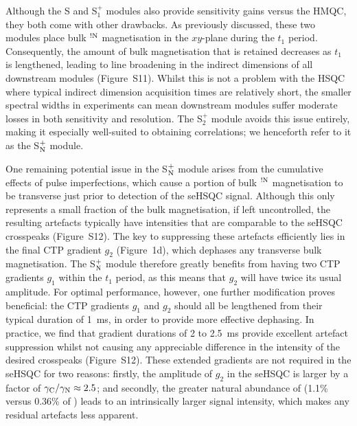 \documentclass[final,twocolumn]{elsarticle}
\newcommand*{\noahS}{S}
\newcommand*{\noahSpa}{S$^+_1$}
\newcommand*{\noahSpb}{S$^+_2$}
\newcommand*{\noahSpn}{S$\rm ^+_N$}
\newcommand*{\carbon}{\ce{^{13}C}}
\newcommand*{\nitrogen}{\ce{^{15}N}}
\newcommand*{\magnnot}[1]{\ce{^1H}$^{!#1}$}
\begin{document}
Although the \noahS{} and \noahSpa{} modules also provide sensitivity gains versus the HMQC, they both come with other drawbacks.
As previously discussed, these two modules place bulk \magnnot{\ce{N}} magnetisation in the $xy$-plane during the $t_1$ period.
Consequently, the amount of bulk magnetisation that is retained decreases as $t_1$ is lengthened, leading to line broadening in the indirect dimensions of all downstream modules (Figure~S11).
Whilst this is not a problem with the \carbon{} HSQC where typical \carbon{} indirect dimension acquisition times are relatively short, the smaller spectral widths in \nitrogen{} experiments can mean downstream modules suffer moderate losses in both sensitivity and resolution.
The \noahSpb{} module avoids this issue entirely, making it especially well-suited to obtaining \nitrogen{} correlations; we henceforth refer to it as the \noahSpn{} module.

One remaining potential issue in the \noahSpn{} module arises from the cumulative effects of pulse imperfections, which cause a portion of bulk \magnnot{\ce{N}} magnetisation to be transverse just prior to detection of the seHSQC signal.
Although this only represents a small fraction of the bulk magnetisation, if left uncontrolled, the resulting artefacts typically have intensities that are comparable to the seHSQC crosspeaks (Figure~S12).
The key to suppressing these artefacts efficiently lies in the final CTP gradient $g_2$ (Figure~1d), which dephases any transverse bulk magnetisation.
The \noahSpn{} module therefore greatly benefits from having two CTP gradients $g_1$ within the $t_1$ period, as this means that $g_2$ will have twice its usual amplitude.
For optimal performance, however, one further modification proves beneficial: the CTP gradients $g_1$ and $g_2$ should all be lengthened from their typical duration of \SI{1}{\ms}, in order to provide more effective dephasing.
In practice, we find that gradient durations of 2 to \SI{2.5}{\ms} provide excellent artefact suppression whilst not causing any appreciable difference in the intensity of the desired crosspeaks (Figure~S12).
These extended gradients are not required in the \carbon{} seHSQC for two reasons: firstly, the amplitude of $g_2$ in the \carbon{} seHSQC is larger by a factor of $\gamma_{\ce{C}}/\gamma_{\ce{N}} \approx 2.5$; and secondly, the greater natural abundance of \carbon{} (1.1\% versus 0.36\% of \nitrogen{}) leads to an intrinsically larger signal intensity, which makes any residual artefacts less apparent.
\end{document}
